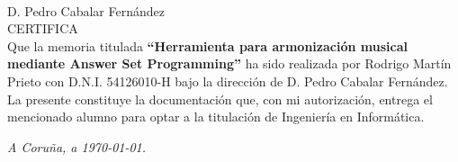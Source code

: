 \thispagestyle{empty}
\mbox{}\\[4cm]
\noindent D. Pedro Cabalar Fernández \\[1cm]
\textsc{CERTIFICA}\\[1.5cm]
\indent Que la memoria titulada \textbf{``Herramienta para armonización musical mediante Answer Set Programming''}
ha sido realizada por Rodrigo Martín Prieto con D.N.I. 54126010-H bajo la
dirección de D. Pedro Cabalar Fernández. La presente constituye la
documentación que, con mi autorización, entrega el mencionado
alumno para optar a la titulación de Ingeniería en Informática.
\vfill
\begin{flushright}
\emph{A Coruña, a \today{}.} \\[2cm]
\end{flushright}